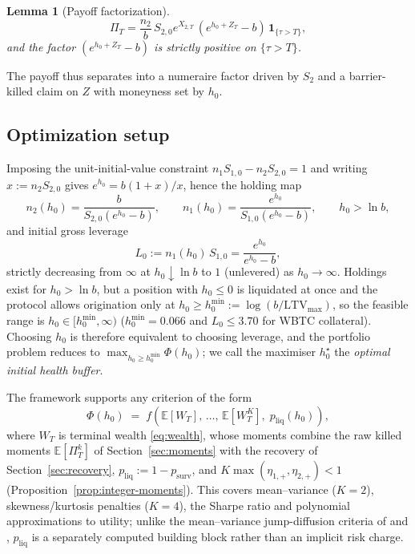 \documentclass[11pt]{article}
\newcommand{\E}{\mathbb{E}}
\newcommand{\one}{\mathbf{1}}
\theoremstyle{plain}
\newtheorem{lemma}[theorem]{Lemma}
\theoremstyle{definition}
\theoremstyle{remark}
\begin{document}
\begin{lemma}[Payoff factorization]\label{lem:payoff-factor}
\begin{equation}\label{eq:payoff-factor}
\Pi_T
=
\frac{n_2}{b}\,S_{2,0}e^{X_{2,T}}\,(e^{h_0+Z_T}-b)\,\one_{\{\tau>T\}},
\end{equation}
and the factor $(e^{h_0+Z_T}-b)$ is strictly positive on $\{\tau>T\}$.
\end{lemma}
The payoff thus separates into a numeraire factor driven by $S_2$ and a barrier-killed claim on $Z$
with moneyness set by $h_0$.

\subsection{Optimization setup}\label{sec:1d}

Imposing the unit-initial-value constraint $n_1S_{1,0}-n_2S_{2,0}=1$ and writing $x:=n_2S_{2,0}$
gives $e^{h_0}=b(1+x)/x$, hence the holding map
\begin{equation}\label{eq:n-from-h0}
n_2(h_0)=\frac{b}{S_{2,0}(e^{h_0}-b)},
\qquad
n_1(h_0)=\frac{e^{h_0}}{S_{1,0}(e^{h_0}-b)},
\qquad h_0>\ln b,
\end{equation}
and initial gross leverage
\begin{equation}\label{eq:leverage}
L_0 := n_1(h_0)\,S_{1,0} = \frac{e^{h_0}}{e^{h_0}-b},
\end{equation}
strictly decreasing from $\infty$ at $h_0\downarrow\ln b$ to $1$ (unlevered) as $h_0\to\infty$.
Holdings exist for $h_0>\ln b$, but a position with $h_0\le0$ is liquidated at once and the protocol
allows origination only at $h_0\ge h_0^{\min}:=\log(b/\mathrm{LTV}_{\max})$, so the feasible range
is $h_0\in[h_0^{\min},\infty)$ ($h_0^{\min}=0.066$ and $L_0\le3.70$ for WBTC collateral). Choosing
$h_0$ is therefore equivalent to choosing leverage, and the portfolio problem reduces to
$\max_{h_0\ge h_0^{\min}}\Phi(h_0)$; we call the maximiser $h_0^\star$ the \emph{optimal initial
health buffer}.

The framework supports any criterion of the form
\begin{equation}\label{eq:Phi-general}
\Phi(h_0) \;=\; f\!\left(\E[W_T],\,\ldots,\,\E[W_T^K],\;p_{\mathrm{liq}}(h_0)\right),
\end{equation}
where $W_T$ is terminal wealth \eqref{eq:wealth}, whose moments combine the raw killed moments
$\E[\Pi_T^k]$ of Section~\ref{sec:moments} with the recovery of Section~\ref{sec:recovery},
$p_{\mathrm{liq}}:=1-p_{\mathrm{surv}}$, and $K\max(\eta_{1,+},\eta_{2,+})<1$
(Proposition~\ref{prop:integer-moments}). This covers mean--variance ($K=2$), skewness/kurtosis
penalties ($K=4$), the Sharpe ratio and polynomial approximations to utility; unlike the
mean--variance jump-diffusion criteria of \citet{DangForsyth2016} and \citet{ShenZou2022},
$p_{\mathrm{liq}}$ is a separately computed building block rather than an implicit risk charge.
\end{document}

